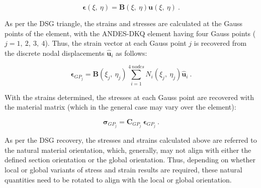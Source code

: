\begin{equation} 
\boldsymbol{\epsilon}(\xi,\ \eta) = \mathbf{B}(\xi,\ \eta) \mathbf{u}(\xi,\ \eta)
\label{eqqrec2}\ .
\end{equation}

As per the DSG triangle, the strains and stresses are calculated at the Gauss points of the element, with the ANDES-DKQ element having four Gauss points ($j = 1,\ 2,\ 3,\ 4$). Thus, the strain vector at each Gauss point $j$ is recovered from the discrete nodal displacements $\hat{\mathbf{u}}_i$ as follows:

\begin{equation} 
\boldsymbol{\epsilon}_{GP_j} = \mathbf{B}(\xi_j,\ \eta_j) \sum_{i=1}^{4\ nodes} N_i(\xi_j,\ \eta_j) \hat{\mathbf{u}}_i
\label{eqqrec3}\ .
\end{equation}

With the strains determined, the stresses at each Gauss point are recovered with the material matrix (which in the general case may vary over the element):

\begin{equation} 
\boldsymbol{\sigma}_{GP_j} = \mathbf{C}_{GP_j}\ \boldsymbol{\epsilon}_{GP_j}
\label{eqqrec4}\ .
\end{equation}

As per the DSG recovery, the stresses and strains calculated above are referred to the natural material orientation, which, generally, may not align with either the defined section orientation or the global orientation. Thus, depending on whether local or global variants of stress and strain results are required, these natural quantities need to be rotated to align with the local or global orientation.

